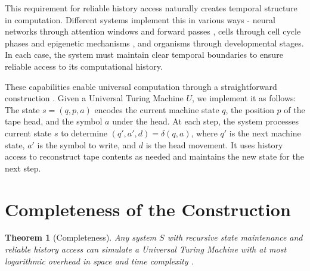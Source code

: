 \documentclass[12pt]{article}
\newtheorem{theorem}{Theorem}
\begin{document}
This requirement for reliable history access naturally creates temporal structure in computation. Different systems implement this in various ways - neural networks through attention windows and forward passes \cite{martini2015information,quentin2019differential}, cells through cell cycle phases and epigenetic mechanisms \cite{bruno2022epigenetic}, and organisms through developmental stages. In each case, the system must maintain clear temporal boundaries to ensure reliable access to its computational history.

These capabilities enable universal computation through a straightforward construction \cite{deutsch1995universality,bennett1989time}. Given a Universal Turing Machine $U$, we implement it as follows: The state $s = (q, p, a)$ encodes the current machine state $q$, the position $p$ of the tape head, and the symbol $a$ under the head. At each step, the system processes current state $s$ to determine $(q', a', d) = \delta(q, a)$, where $q'$ is the next machine state, $a'$ is the symbol to write, and $d$ is the head movement. It uses history access to reconstruct tape contents as needed and maintains the new state for the next step.

\section{Completeness of the Construction}

\begin{theorem}[Completeness]
Any system $S$ with recursive state maintenance and reliable history access can simulate a Universal Turing Machine with at most logarithmic overhead in space and time complexity \cite{boyle2024memory,liskiewicz1994complexity}.
\end{theorem}
\end{document}
